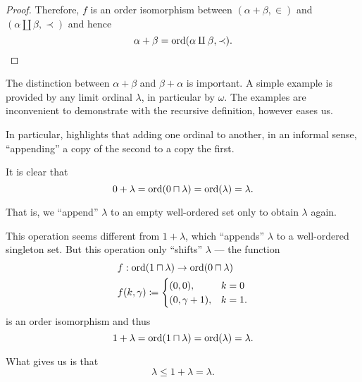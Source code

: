 \begin{proof}
  Therefore, \( f \) is an order isomorphism between \( (\alpha + \beta, \in) \) and \( (\alpha \amalg \beta, \prec) \) and hence
  \begin{equation*}
    \alpha + \beta = \operatorname{ord}(\alpha \amalg \beta, \prec).
  \end{equation*}
\end{proof}

\begin{example}\label{ex:ordinal_addition}
  The distinction between \( \alpha + \beta \) and \( \beta + \alpha \) is important. A simple example is provided by any limit ordinal \( \lambda \), in particular by \( \omega \). The examples are inconvenient to demonstrate with the recursive definition, however  eases us.

  In particular,  highlights that adding one ordinal to another, in an informal sense, \enquote{appending} a copy of the second to a copy the first.

  It is clear that
  \begin{equation*}
    0 + \lambda = \operatorname{ord}(0 \sqcap \lambda) = \operatorname{ord}(\lambda) = \lambda.
  \end{equation*}

  That is, we \enquote{append} \( \lambda \) to an empty well-ordered set only to obtain \( \lambda \) again.

  This operation seems different from \( 1 + \lambda \), which \enquote{appends} \( \lambda \) to a well-ordered singleton set. But this operation only \enquote{shifts} \( \lambda \) --- the function
  \begin{equation*}
    \begin{aligned}
      &f: \operatorname{ord}(1 \sqcap \lambda) \to \operatorname{ord}(0 \sqcap \lambda) \\
      &f(k, \gamma) \coloneqq \begin{cases}
        (0, 0),          &k = 0 \\
        (0, \gamma + 1), &k = 1.
      \end{cases}
    \end{aligned}
  \end{equation*}
  is an order isomorphism and thus
  \begin{equation*}
    1 + \lambda = \operatorname{ord}(1 \sqcap \lambda) = \operatorname{ord}(\lambda) = \lambda.
  \end{equation*}

  What  gives us is that
  \begin{equation*}
    \lambda \leq 1 + \lambda = \lambda.
  \end{equation*}


\end{example}
